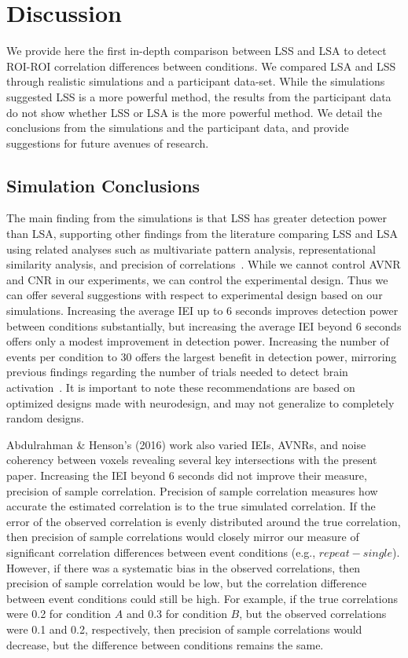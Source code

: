 \documentclass[phd,appendix,figures]{uithesis}
\begin{document}
\section{Discussion}
\label{discussion}

We provide here the first in-depth comparison between LSS and LSA to detect 
ROI-ROI correlation differences between conditions.
We compared LSA and LSS through realistic simulations and a participant data-set.
While the simulations suggested LSS is a more powerful method,
the results from the participant data do not show whether LSS or LSA is the more powerful method.
We detail the conclusions from the simulations and the participant data, and provide
suggestions for future avenues of research.

\subsection*{Simulation Conclusions}
\label{discussion:simulation-conclusions}

The main finding from the simulations is that LSS has greater detection power than LSA,
supporting other findings from the literature comparing LSS and LSA using related analyses such as
multivariate pattern analysis, representational similarity analysis, and precision of correlations~\cite{Mumford2012,Mumford2014a,Abdulrahman2016,Turner2012a}.
While we cannot control AVNR and CNR in our experiments, we can control the experimental design.
Thus we can offer several suggestions with respect to experimental design based on our simulations.
Increasing the average IEI up to 6 seconds improves detection power between conditions substantially,
but increasing the average IEI beyond 6 seconds offers only a modest improvement in detection power.
Increasing the number of events per condition to 30 offers the largest benefit in detection power,
mirroring previous findings regarding the number of trials needed to detect brain activation~\cite{Huettel2001}.
It is important to note these recommendations are based on optimized designs made with neurodesign,
and may not generalize to completely random designs.

Abdulrahman \& Henson's (2016) work also varied IEIs, AVNRs, and noise coherency between voxels
revealing several key intersections with the present paper.
Increasing the IEI beyond 6 seconds did not improve their measure, precision of sample correlation.
Precision of sample correlation measures how accurate the estimated correlation is to the true
simulated correlation.
If the error of the observed correlation is evenly distributed around the
true correlation, then precision of sample correlations would closely mirror our measure of
significant correlation differences between event conditions (e.g., $repeat - single$).
However, if there was a systematic bias in the observed correlations, then precision of sample correlation
would be low, but the correlation difference between event conditions could still be high.
For example, if the true correlations were 0.2 for condition $A$ and 0.3 for condition $B$, but
the observed correlations were 0.1 and 0.2, respectively, then precision of sample correlations would
decrease, but the difference between conditions remains the same.
\end{document}
